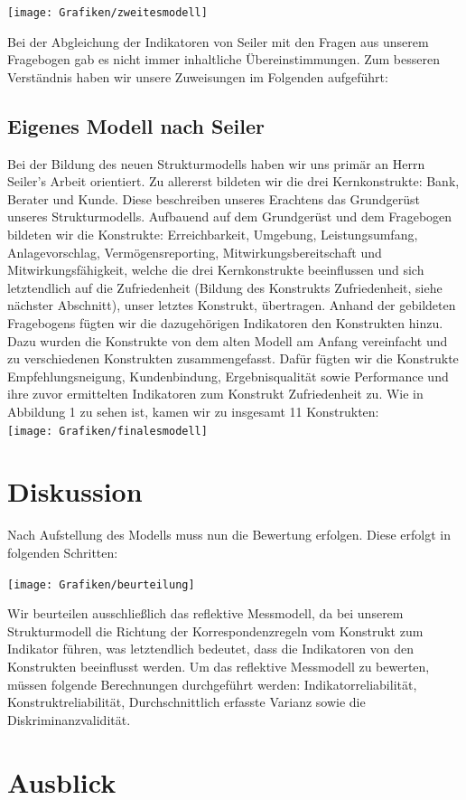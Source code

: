 \documentclass{article}\usepackage[]{graphicx}\usepackage[]{color}
\begin{document}
\hspace*{-4.8cm}\texttt{[image: Grafiken/zweitesmodell]}


Bei der Abgleichung der Indikatoren von Seiler mit den Fragen aus unserem Fragebogen gab es nicht immer inhaltliche Übereinstimmungen. Zum besseren Verständnis haben wir unsere Zuweisungen im Folgenden aufgeführt:



\subsection{Eigenes Modell nach Seiler}
Bei der Bildung des neuen Strukturmodells haben wir uns primär an Herrn Seiler's Arbeit orientiert. Zu allererst bildeten wir die drei Kernkonstrukte: Bank, Berater und Kunde. Diese beschreiben unseres Erachtens das Grundgerüst unseres Strukturmodells. Aufbauend auf dem Grundgerüst und dem Fragebogen bildeten wir die Konstrukte: Erreichbarkeit, Umgebung, Leistungsumfang, Anlagevorschlag, Vermögensreporting, Mitwirkungsbereitschaft und Mitwirkungsfähigkeit, welche die drei Kernkonstrukte beeinflussen und sich letztendlich auf die Zufriedenheit (Bildung des Konstrukts Zufriedenheit, siehe nächster Abschnitt), unser letztes Konstrukt, übertragen. Anhand der gebildeten Fragebogens fügten wir die dazugehörigen Indikatoren den Konstrukten hinzu.
Dazu wurden die Konstrukte von dem alten Modell am Anfang vereinfacht und zu verschiedenen Konstrukten zusammengefasst. Dafür fügten wir die Konstrukte Empfehlungsneigung, Kundenbindung, Ergebnisqualität sowie Performance und ihre zuvor ermittelten Indikatoren zum Konstrukt Zufriedenheit zu. Wie in Abbildung 1 zu sehen ist, kamen wir zu insgesamt 11 Konstrukten:\\


\hspace*{-4.8cm}\texttt{[image: Grafiken/finalesmodell]}




\section{Diskussion}%
Nach Aufstellung des Modells muss nun die Bewertung erfolgen. Diese erfolgt in folgenden Schritten:

\texttt{[image: Grafiken/beurteilung]}

Wir beurteilen ausschließlich das reflektive Messmodell, da bei unserem Strukturmodell die Richtung der Korrespondenzregeln vom Konstrukt zum Indikator führen, was letztendlich bedeutet, dass die Indikatoren von den Konstrukten beeinflusst werden. Um das reflektive Messmodell zu bewerten, müssen folgende Berechnungen durchgeführt werden: Indikatorreliabilität, Konstruktreliabilität, Durchschnittlich erfasste Varianz sowie die Diskriminanzvalidität.

\section{Ausblick}%





\appendix
\end{document}
